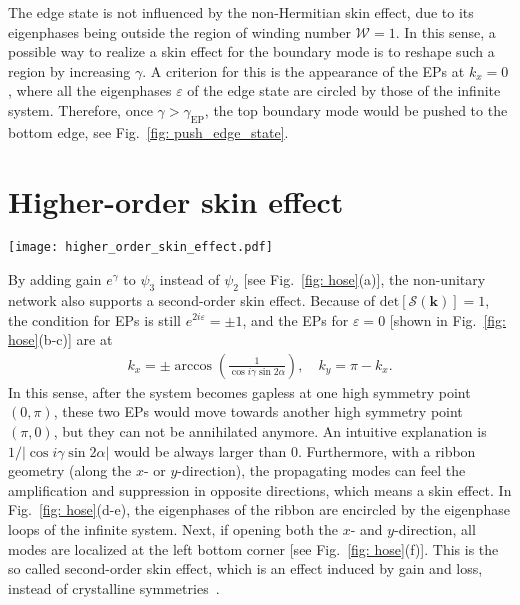 \documentclass[aps,pra,reprint,superscriptaddress,showkeys,amsmath,amssymb,longbibliography]{revtex4-1}
\begin{document}
The edge state is not influenced by the non-Hermitian skin effect, due to its eigenphases being outside the region of winding number $\mathcal{W}=1$.
In this sense, a possible way to realize a skin effect for the boundary mode is to reshape such a region by increasing $\gamma$.
A criterion for this is the appearance of the EPs at $k_x=0$, where all the eigenphases $\varepsilon$ of the edge state are circled by those of the infinite system.
Therefore, once $\gamma>\gamma_{\text{EP}}$, the top boundary mode would be pushed to the bottom edge, see Fig.~\ref{fig: push_edge_state}.

\section{Higher-order skin effect}
\label{app:hose}

\begin{figure*}[tb]
\centering
\texttt{[image: higher\_order\_skin\_effect.pdf]}
\caption{(a) Illustration of the non-unitary network model with the second-order skin effect.
(b) and (c) are the real and imaginary eigenphase spectra. 
(d) and (e) are the ribbon geometry eigenphase spectrum encircled by the bulk dispersion along the $k_x$- and $k_y$-directions, respectively. 
(f) the probability distribution of all the eigenstates with a system size $20\times 20$. 
All of the plots are obtained using $\alpha=\pi/4$ and $\gamma=0.5$.
\label{fig: hose}}
\end{figure*}

By adding gain $e^{\gamma}$ to $\psi_3$ instead of $\psi_2$ [see Fig.~\ref{fig: hose}(a)], the non-unitary network also supports a second-order skin effect.
Because of $\text{det}[\mathcal{S}(\textbf{k})]=1$, the condition for EPs is still $e^{2i\varepsilon}=\pm 1$, and the EPs for $\varepsilon=0$ [shown in Fig.~\ref{fig: hose}(b-c)] are at
\begin{eqnarray}
  k_x=\pm\arccos(\frac{1}{\cos i\gamma \sin 2\alpha}),
  \quad k_y=\pi-k_x.
\end{eqnarray}  
In this sense, after the system becomes gapless at one high symmetry point $(0,\pi)$, these two EPs would move towards another high symmetry point $(\pi,0)$, but they can not be annihilated anymore.
An intuitive explanation is $1/|\cos i\gamma \sin 2\alpha|$ would be always larger than $0$.
Furthermore, with a ribbon geometry (along the $x$- or $y$-direction), the propagating modes can feel the amplification and suppression in opposite directions, which means a skin effect.
In Fig.~\ref{fig: hose}(d-e), the eigenphases of the ribbon are encircled by the eigenphase loops of the infinite system.
Next, if opening both the $x$- and $y$-direction, all modes are localized at the left bottom corner [see Fig.~\ref{fig: hose}(f)].
This is the so called second-order skin effect, which is an effect induced by gain and loss, instead of crystalline symmetries~\cite{Benalcazar61, Benalcazar_prb, Liu2021}.
\end{document}
